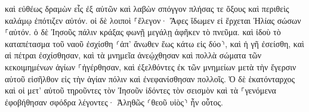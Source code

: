 \documentclass{openreader}
\begin{document}
καὶ εὐθέως δραμὼν εἷς ἐξ αὐτῶν καὶ λαβὼν σπόγγον πλήσας τε ὄξους καὶ περιθεὶς καλάμῳ ἐπότιζεν αὐτόν. 
οἱ δὲ λοιποὶ ⸀ἔλεγον· Ἄφες ἴδωμεν εἰ ἔρχεται Ἠλίας σώσων ⸀αὐτόν. 
ὁ δὲ Ἰησοῦς πάλιν κράξας φωνῇ μεγάλῃ ἀφῆκεν τὸ πνεῦμα. 
καὶ ἰδοὺ τὸ καταπέτασμα τοῦ ναοῦ ἐσχίσθη ⸂ἀπ’ ἄνωθεν ἕως κάτω εἰς δύο⸃, καὶ ἡ γῆ ἐσείσθη, καὶ αἱ πέτραι ἐσχίσθησαν, 
καὶ τὰ μνημεῖα ἀνεῴχθησαν καὶ πολλὰ σώματα τῶν κεκοιμημένων ἁγίων ⸀ἠγέρθησαν, 
καὶ ἐξελθόντες ἐκ τῶν μνημείων μετὰ τὴν ἔγερσιν αὐτοῦ εἰσῆλθον εἰς τὴν ἁγίαν πόλιν καὶ ἐνεφανίσθησαν πολλοῖς. 
Ὁ δὲ ἑκατόνταρχος καὶ οἱ μετ’ αὐτοῦ τηροῦντες τὸν Ἰησοῦν ἰδόντες τὸν σεισμὸν καὶ τὰ ⸀γενόμενα ἐφοβήθησαν σφόδρα λέγοντες· Ἀληθῶς ⸂θεοῦ υἱὸς⸃ ἦν οὗτος. 
\end{document}
